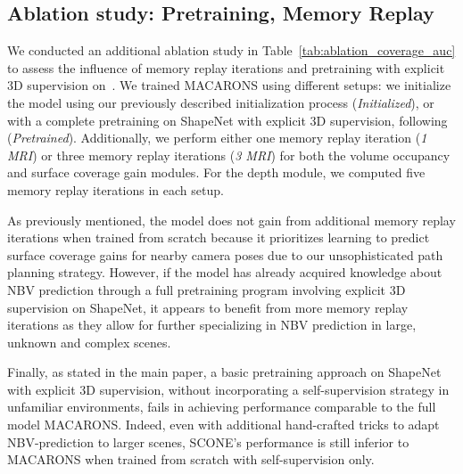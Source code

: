 \subsection{Ablation study: Pretraining, Memory Replay}

We conducted an additional ablation study in Table~\ref{tab:ablation_coverage_auc} to assess the influence of memory replay iterations and pretraining with explicit 3D supervision on~\cite{chang-15-shapenet}. We trained MACARONS using different setups: we initialize the model using our previously described initialization process (\emph{Initialized}), or with a complete pretraining on ShapeNet with explicit 3D supervision, following~\cite{guedon-nips22-scone-surface-coverage} (\emph{Pretrained}). Additionally, we perform either one memory replay iteration (\emph{1 MRI}) or three memory replay iterations (\emph{3 MRI}) for both the volume occupancy and surface coverage gain modules. For the depth module, we computed five memory replay iterations in each setup.

As previously mentioned, the model does not gain from additional memory replay iterations when trained from scratch because it prioritizes learning to predict surface coverage gains for nearby camera poses due to our unsophisticated path planning strategy. However, if the model has already acquired knowledge about NBV prediction through a full pretraining program involving explicit 3D supervision on ShapeNet, it appears to benefit from more memory replay iterations as they allow for further specializing in NBV prediction in large, unknown and complex scenes.

Finally, as stated in the main paper, a basic pretraining approach on ShapeNet with explicit 3D supervision, without incorporating a self-supervision strategy in unfamiliar environments, fails in achieving performance comparable to the full model MACARONS. Indeed, even with additional hand-crafted tricks to adapt NBV-prediction to larger scenes, SCONE's performance is still inferior to MACARONS when trained from scratch with self-supervision only.

